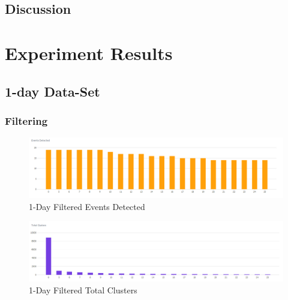 \documentclass[a4paper,portrait,12pt]{article}
\begin{document}
\subsection{Discussion}

\newpage
\nocite{*}


\pagebreak

\appendix

\section{Experiment Results}
\label{appendix:results}

\subsection{1-day Data-Set}
\subsubsection{Filtering}

\begin{figure}[H]
	\centering
	\includegraphics[width=\linewidth]{images/1day-filtered-events-detected.png}
	\caption{1-Day Filtered Events Detected}
	\label{fig:1day-filtered-events-detected}
\end{figure}

\begin{figure}[H]
	\centering
	\includegraphics[width=\linewidth]{images/1day-filtered-total-clusters.png}
	\caption{1-Day Filtered Total Clusters}
	\label{fig:1day-filtered-total-clusters}
\end{figure}
\end{document}
